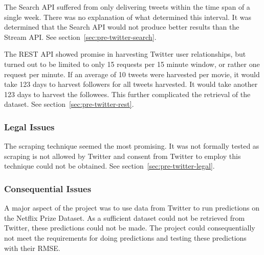 The Search API suffered from only delivering tweets within the time span of a single week. There was no explanation of what determined this interval. It was determined that the Search API would not produce better results than the Stream API. See section~\ref{sec:pre-twitter-search}.

The REST API showed promise in harvesting Twitter user relationships, but turned out to be limited to only 15 requests per 15 minute window, or rather one request per minute. If an average of 10 tweets were harvested per movie, it would take 123 days to harvest followers for all tweets harvested. It would take another 123 days to harvest the followees. This further complicated the retrieval of the dataset. See section~\ref{sec:pre-twitter-rest}.

\subsubsection{Legal Issues}
The scraping technique seemed the most promising. It was not formally tested as scraping is not allowed by Twitter and consent from Twitter to employ this technique could not be obtained. See section~\ref{sec:pre-twitter-legal}.

\subsubsection{Consequential Issues}
A major aspect of the project was to use data from Twitter to run predictions on the Netflix Prize Dataset. As a sufficient dataset could not be retrieved from Twitter, these predictions could not be made. The project could consequentially not meet the requirements for doing predictions and testing these predictions with their RMSE.
